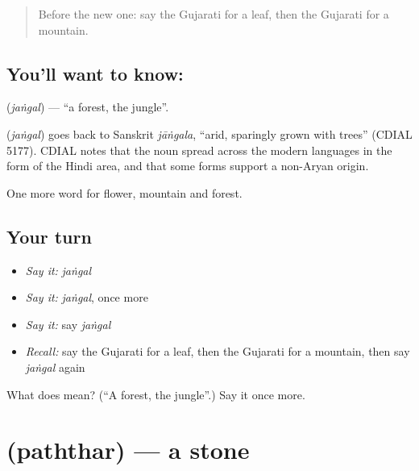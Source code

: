 \label{lesson:GU-C64-forest}



\begin{quote}
Before the new one: say the Gujarati for a leaf, then the Gujarati for a mountain.
\end{quote}

\subsection*{You'll want to know: }
\textbf{} (\emph{jaṅgal}) — \textquotedblleft{}a forest, the jungle\textquotedblright{}.

\begin{cousinweb}
\textbf{} (\emph{jaṅgal}) goes back to Sanskrit \emph{jāṅgala}, \textquotedblleft{}arid, sparingly grown with trees\textquotedblright{} (CDIAL 5177). CDIAL notes that the noun spread across the modern languages in the form of the Hindi area, and that some forms support a non-Aryan origin.
\end{cousinweb}

\begin{grammarlens}[title={What you've built}]
One more word for flower, mountain and forest.
\end{grammarlens}

\subsection*{Your turn}
\begin{itemize}
\raggedright
  \item \emph{Say it:} \emph{jaṅgal}
  \item \emph{Say it:} \emph{jaṅgal}, once more
  \item \emph{Say it:} say \emph{jaṅgal}
  \item \emph{Recall:} say the Gujarati for a leaf, then the Gujarati for a mountain, then say \emph{jaṅgal} again
\end{itemize}

\begin{tcolorbox}[breakable,colback=teal!4,colframe=teal!35!black,title={Before you move on}]
What does  mean? (\textquotedblleft{}A forest, the jungle\textquotedblright{}.) Say it once more.
\end{tcolorbox}
\section[\texorpdfstring{\gu{પથ્થર} (paththar)}{પથ્થર (paththar)}]{ (paththar) — a stone}


